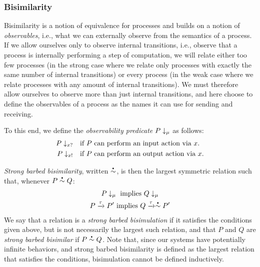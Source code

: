 
\subsubsection{Bisimilarity}
Bisimilarity is a notion of equivalence for processes and
builds on a notion of \emph{observables}, i.e., what we can externally
observe from the semantics of a process. If we allow ourselves only to observe
internal transitions, i.e., observe that a process is internally
performing a step of computation, we will relate either too few
processes (in the strong case where we relate only processes with
exactly the same number of internal transitions) or every process (in
the weak case where we relate processes with any amount of internal
transitions).  We must therefore allow ourselves to observe more than
just internal transitions, and here choose to define the observables
of a process as the names it can use for sending and receiving.

To this end, we define the \emph{observability predicate}
\( P\downarrow_{\mu} \) as follows:
\begin{align}
  P\downarrow_{x?}  &\quad \textrm{if \( P \) can perform an input action via \( x \).} \\
  P\downarrow_{x!} &\quad \textrm{if \( P \) can perform an output action via \( x \).}
\end{align}

\emph{Strong barbed bisimilarity}, written \( \sbbisim{}{} \), is then the largest symmetric relation such that, whenever \( \sbbisim{P}{Q} \):
\begin{gather}
  \observable{P}{\mu}~\textrm{implies}~\observable{Q}{\mu}\label{eq:bisim1} \\
  \transition{P}{\Atau}{P'}~\textrm{implies}~\transition{Q}{\Atau}{\sbbisim{}{} P'}\label{eq:bisim2}
\end{gather}
We say that a relation is a \emph{strong barbed bisimulation} if it satisfies the conditions given above, but is not necessarily the largest such relation, and that \( P \) and \( Q \) are \emph{strong barbed bisimilar} if \( \sbbisim{P}{Q} \).
Note that, since our systems have potentially infinite behaviors, and strong barbed bisimilarity is defined as the largest relation that satisfies the conditions, bisimulation cannot be defined inductively.

